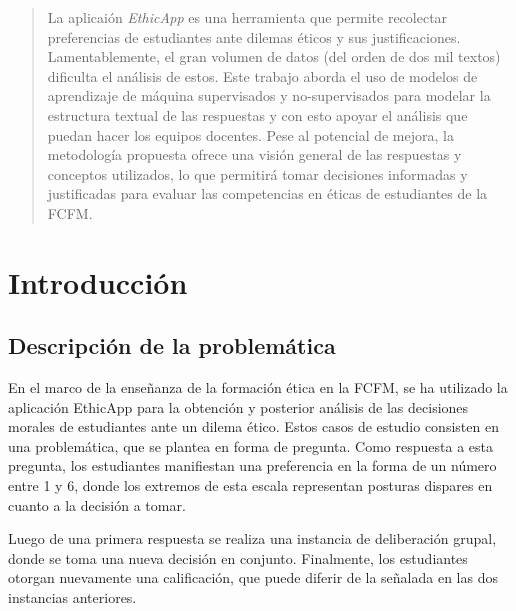 \documentclass[
	spanish, %
	letterpaper, oneside
]{article}
\begin{document}
	
\templatePagecfg


\templateFinalcfg


\inserttitle

\begin{abstract}
    La aplicaión \textit{EthicApp} es una herramienta que permite recolectar preferencias de estudiantes ante dilemas éticos y sus justificaciones. Lamentablemente, el gran volumen de datos (del orden de dos mil textos) dificulta el análisis de estos. Este trabajo aborda el uso de modelos de aprendizaje de máquina supervisados y no-supervisados para modelar la estructura textual de las respuestas y con esto apoyar el análisis que puedan hacer los equipos docentes. Pese al potencial de mejora, la metodología propuesta ofrece una visión general de las respuestas y conceptos utilizados, lo que permitirá tomar decisiones informadas y justificadas para evaluar las competencias en éticas de estudiantes de la FCFM.
\end{abstract}


\section{Introducción}

\subsection{Descripción de la problemática}

En el marco de la enseñanza de la formación ética en la FCFM, se ha utilizado la aplicación EthicApp para la obtención y posterior análisis de las decisiones morales de estudiantes ante un dilema ético. Estos casos de estudio consisten en una problemática, que se plantea en forma de pregunta. Como respuesta a esta pregunta, los estudiantes manifiestan una preferencia en la forma de un número entre 1 y 6, donde los extremos de esta escala representan posturas dispares en cuanto a la decisión a tomar.


Luego de una primera respuesta se realiza una instancia de deliberación grupal, donde se toma una nueva decisión en conjunto. Finalmente, los estudiantes otorgan nuevamente una calificación, que puede diferir de la señalada en las dos instancias anteriores.
\end{document}
